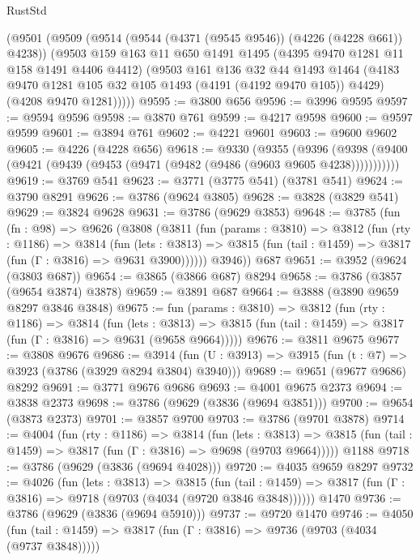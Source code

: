 \begin{lexlean}{RustStd}
\begin{coremodule}
    (@9501
      (@9509
        (@9514 (@9544 (@4371 (@9545 @9546)) (@4226 (@4228 @661)) @4238))
        (@9503
          @159
          @163
          @11
          @650
          @1491
          @1495
          (@4395 @9470 @1281 @11 @158 @1491 @4406 @4412)
          (@9503
            @161
            @136
            @32
            @44
            @1493
            @1464
            (@4183 @9470 @1281 @105 @32 @105 @1493 (@4191 (@4192 @9470 @105)) @4429)
            (@4208 @9470 @1281)))))
@9595 := @3800 @656
@9596 := @3996 @9595
@9597 := @9594 @9596
@9598 := @3870 @761
@9599 := @4217 @9598
@9600 := @9597 @9599
@9601 := @3894 @761
@9602 := @4221 @9601
@9603 := @9600 @9602
@9605 := @4226 (@4228 @656)
@9618 := @9330
    (@9355
      (@9396 (@9398 (@9400 (@9421 (@9439 (@9453 (@9471 (@9482 (@9486 (@9603 @9605 @4238)))))))))))
@9619 := @3769 @541
@9623 := @3771 (@3775 @541) (@3781 @541)
@9624 := @3790 @8291
@9626 := @3786 (@9624 @3805)
@9628 := @3828 (@3829 @541)
@9629 := @3824 @9628
@9631 := @3786 (@9629 @3853)
@9648 := @3785
    (fun (fn : @98) =>
    @9626
      (@3808
        (@3811
          (fun (params : @3810) =>
          @3812
            (fun (rty : @1186) =>
            @3814
              (fun (lets : @3813) =>
              @3815 (fun (tail : @1459) => @3817 (fun (Γ : @3816) => @9631 @3900))))))
        @3946))
    @687
@9651 := @3952 (@9624 (@3803 @687))
@9654 := @3865 (@3866 @687) @8294
@9658 := @3786 (@3857 (@9654 @3874) @3878)
@9659 := @3891 @687
@9664 := @3888 (@3890 @9659 @8297 @3846 @3848)
@9675 := fun (params : @3810) =>
  @3812
    (fun (rty : @1186) =>
    @3814
      (fun (lets : @3813) =>
      @3815 (fun (tail : @1459) => @3817 (fun (Γ : @3816) => @9631 (@9658 @9664)))))
@9676 := @3811 @9675
@9677 := @3808 @9676
@9686 := @3914 (fun (U : @3913) => @3915 (fun (t : @7) => @3923 (@3786 (@3929 @8294 @3804) @3940)))
@9689 := @9651 (@9677 @9686) @8292
@9691 := @3771 @9676 @9686
@9693 := @4001 @9675 @2373
@9694 := @3838 @2373
@9698 := @3786 (@9629 (@3836 (@9694 @3851)))
@9700 := @9654 (@3873 @2373)
@9701 := @3857 @9700
@9703 := @3786 (@9701 @3878)
@9714 := @4004
    (fun (rty : @1186) =>
    @3814
      (fun (lets : @3813) =>
      @3815 (fun (tail : @1459) => @3817 (fun (Γ : @3816) => @9698 (@9703 @9664)))))
    @1188
@9718 := @3786 (@9629 (@3836 (@9694 @4028)))
@9720 := @4035 @9659 @8297
@9732 := @4026
    (fun (lets : @3813) =>
    @3815
      (fun (tail : @1459) => @3817 (fun (Γ : @3816) => @9718 (@9703 (@4034 (@9720 @3846 @3848))))))
    @1470
@9736 := @3786 (@9629 (@3836 (@9694 @5910)))
@9737 := @9720 @1470
@9746 := @4050
    (fun (tail : @1459) => @3817 (fun (Γ : @3816) => @9736 (@9703 (@4034 (@9737 @3848)))))

\end{coremodule}
\end{lexlean}
